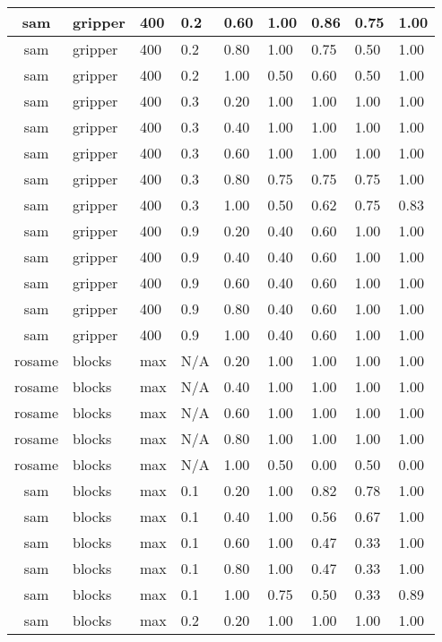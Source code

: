 \begin{table}[ht]
\begin{tabular}{c}
sam & gripper & 400 & 0.2 & 0.60 & 1.00 & 0.86 & 0.75 & 1.00 \\ \hline
sam & gripper & 400 & 0.2 & 0.80 & 1.00 & 0.75 & 0.50 & 1.00 \\ \hline
sam & gripper & 400 & 0.2 & 1.00 & 0.50 & 0.60 & 0.50 & 1.00 \\ \hline
sam & gripper & 400 & 0.3 & 0.20 & 1.00 & 1.00 & 1.00 & 1.00 \\ \hline
sam & gripper & 400 & 0.3 & 0.40 & 1.00 & 1.00 & 1.00 & 1.00 \\ \hline
sam & gripper & 400 & 0.3 & 0.60 & 1.00 & 1.00 & 1.00 & 1.00 \\ \hline
sam & gripper & 400 & 0.3 & 0.80 & 0.75 & 0.75 & 0.75 & 1.00 \\ \hline
sam & gripper & 400 & 0.3 & 1.00 & 0.50 & 0.62 & 0.75 & 0.83 \\ \hline
sam & gripper & 400 & 0.9 & 0.20 & 0.40 & 0.60 & 1.00 & 1.00 \\ \hline
sam & gripper & 400 & 0.9 & 0.40 & 0.40 & 0.60 & 1.00 & 1.00 \\ \hline
sam & gripper & 400 & 0.9 & 0.60 & 0.40 & 0.60 & 1.00 & 1.00 \\ \hline
sam & gripper & 400 & 0.9 & 0.80 & 0.40 & 0.60 & 1.00 & 1.00 \\ \hline
sam & gripper & 400 & 0.9 & 1.00 & 0.40 & 0.60 & 1.00 & 1.00 \\ \hline
rosame & blocks & max & N/A & 0.20 & 1.00 & 1.00 & 1.00 & 1.00 \\ \hline
rosame & blocks & max & N/A & 0.40 & 1.00 & 1.00 & 1.00 & 1.00 \\ \hline
rosame & blocks & max & N/A & 0.60 & 1.00 & 1.00 & 1.00 & 1.00 \\ \hline
rosame & blocks & max & N/A & 0.80 & 1.00 & 1.00 & 1.00 & 1.00 \\ \hline
rosame & blocks & max & N/A & 1.00 & 0.50 & 0.00 & 0.50 & 0.00 \\ \hline
sam & blocks & max & 0.1 & 0.20 & 1.00 & 0.82 & 0.78 & 1.00 \\ \hline
sam & blocks & max & 0.1 & 0.40 & 1.00 & 0.56 & 0.67 & 1.00 \\ \hline
sam & blocks & max & 0.1 & 0.60 & 1.00 & 0.47 & 0.33 & 1.00 \\ \hline
sam & blocks & max & 0.1 & 0.80 & 1.00 & 0.47 & 0.33 & 1.00 \\ \hline
sam & blocks & max & 0.1 & 1.00 & 0.75 & 0.50 & 0.33 & 0.89 \\ \hline
sam & blocks & max & 0.2 & 0.20 & 1.00 & 1.00 & 1.00 & 1.00 \\ \hline

\end{tabular}
\end{table}
